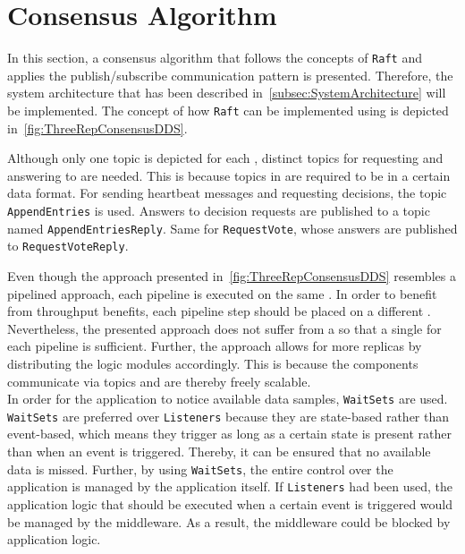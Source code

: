 \section{Consensus Algorithm}
\label{sec:ImpConsensusAlgorithm}

In this section, a consensus algorithm that follows the concepts of \texttt{Raft} and applies the  publish/subscribe communication pattern is presented.
Therefore, the system architecture that has been described in~\autoref{subsec:SystemArchitecture} will be implemented.
The concept of how \texttt{Raft} can be implemented using  is depicted in~\autoref{fig:ThreeRepConsensusDDS}.

Although only one topic is depicted for each , distinct  topics for requesting and answering to  are needed.
This is because topics in  are required to be in a certain data format.
For sending heartbeat messages and requesting decisions, the topic \texttt{AppendEntries} is used.
Answers to decision requests are published to a topic named \texttt{AppendEntriesReply}.
Same for \texttt{RequestVote}, whose answers are published to \texttt{RequestVoteReply}.

Even though the approach presented in~\autoref{fig:ThreeRepConsensusDDS} resembles a pipelined approach, each pipeline is executed on the same .
In order to benefit from throughput benefits, each pipeline step should be placed on a different .
Nevertheless, the presented approach does not suffer from a \ChallengeThrough so that a single  for each pipeline is sufficient.
Further, the approach allows for more replicas by distributing the logic modules accordingly.
This is because the components communicate via  topics and are thereby freely scalable.
\\

In order for the application to notice available data samples, \texttt{WaitSets} are used.
\texttt{WaitSets} are preferred over \texttt{Listeners} because they are state-based rather than event-based, which means they trigger as long as a certain state is present rather than when an event is triggered.
Thereby, it can be ensured that no available data is missed.
Further, by using \texttt{WaitSets}, the entire control over the application is managed by the application itself.
If \texttt{Listeners} had been used, the application logic that should be executed when a certain event is triggered would be managed by the middleware.
As a result, the middleware could be blocked by application logic.
\\

